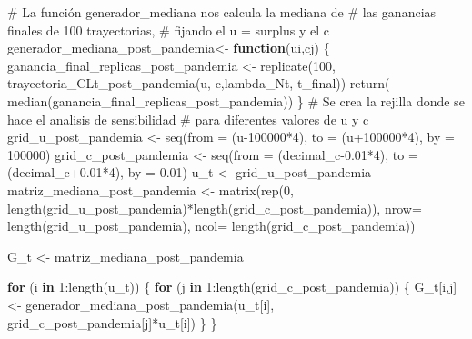 \documentclass[
  us-letterpaper,
]{scrreprt}
\newenvironment{Shaded}{\begin{snugshade}}{\end{snugshade}}
\newcommand{\AttributeTok}[1]{\textcolor[rgb]{0.40,0.45,0.13}{#1}}
\newcommand{\CommentTok}[1]{\textcolor[rgb]{0.37,0.37,0.37}{#1}}
\newcommand{\ControlFlowTok}[1]{\textcolor[rgb]{0.00,0.23,0.31}{\textbf{#1}}}
\newcommand{\DecValTok}[1]{\textcolor[rgb]{0.68,0.00,0.00}{#1}}
\newcommand{\FloatTok}[1]{\textcolor[rgb]{0.68,0.00,0.00}{#1}}
\newcommand{\FunctionTok}[1]{\textcolor[rgb]{0.28,0.35,0.67}{#1}}
\newcommand{\NormalTok}[1]{\textcolor[rgb]{0.00,0.23,0.31}{#1}}
\newcommand{\OtherTok}[1]{\textcolor[rgb]{0.00,0.23,0.31}{#1}}
\newcommand{\SpecialCharTok}[1]{\textcolor[rgb]{0.37,0.37,0.37}{#1}}
\theoremstyle{plain}
\theoremstyle{plain}
\theoremstyle{definition}
\theoremstyle{remark}
\begin{document}
\begin{Shaded}
\begin{Highlighting}[]
\CommentTok{\# La función generador\_mediana nos calcula la mediana de }
\CommentTok{\# las ganancias finales de 100 trayectorias, }
\CommentTok{\# fijando el u = surplus y el c}
\NormalTok{generador\_mediana\_post\_pandemia}\OtherTok{\textless{}{-}} \ControlFlowTok{function}\NormalTok{(ui,cj)}
\NormalTok{  \{}
\NormalTok{  ganancia\_final\_replicas\_post\_pandemia }\OtherTok{\textless{}{-}} \FunctionTok{replicate}\NormalTok{(}\DecValTok{100}\NormalTok{,}
           \FunctionTok{trayectoria\_CLt\_post\_pandemia}\NormalTok{(u, c,lambda\_Nt, t\_final))}
    \FunctionTok{return}\NormalTok{( }\FunctionTok{median}\NormalTok{(ganancia\_final\_replicas\_post\_pandemia))}
\NormalTok{  \}}
\CommentTok{\# Se crea la rejilla donde se hace el analisis de sensibilidad}
\CommentTok{\# para diferentes valores de u y c}
\NormalTok{grid\_u\_post\_pandemia }\OtherTok{\textless{}{-}} \FunctionTok{seq}\NormalTok{(}\AttributeTok{from =}\NormalTok{ (u}\DecValTok{{-}100000}\SpecialCharTok{*}\DecValTok{4}\NormalTok{), }
                            \AttributeTok{to =}\NormalTok{ (u}\SpecialCharTok{+}\DecValTok{100000}\SpecialCharTok{*}\DecValTok{4}\NormalTok{), }
                            \AttributeTok{by =} \DecValTok{100000}\NormalTok{)}
\NormalTok{grid\_c\_post\_pandemia }\OtherTok{\textless{}{-}} \FunctionTok{seq}\NormalTok{(}\AttributeTok{from =}\NormalTok{ (decimal\_c}\FloatTok{{-}0.01}\SpecialCharTok{*}\DecValTok{4}\NormalTok{), }
                            \AttributeTok{to =}\NormalTok{ (decimal\_c}\FloatTok{+0.01}\SpecialCharTok{*}\DecValTok{4}\NormalTok{), }
                            \AttributeTok{by =} \FloatTok{0.01}\NormalTok{)}
\NormalTok{u\_t }\OtherTok{\textless{}{-}}\NormalTok{ grid\_u\_post\_pandemia}
\NormalTok{matriz\_mediana\_post\_pandemia }\OtherTok{\textless{}{-}} \FunctionTok{matrix}\NormalTok{(}\FunctionTok{rep}\NormalTok{(}\DecValTok{0}\NormalTok{, }
      \FunctionTok{length}\NormalTok{(grid\_u\_post\_pandemia)}\SpecialCharTok{*}\FunctionTok{length}\NormalTok{(grid\_c\_post\_pandemia)),}
      \AttributeTok{nrow=} \FunctionTok{length}\NormalTok{(grid\_u\_post\_pandemia), }
      \AttributeTok{ncol=} \FunctionTok{length}\NormalTok{(grid\_c\_post\_pandemia))}

\NormalTok{G\_t }\OtherTok{\textless{}{-}}\NormalTok{ matriz\_mediana\_post\_pandemia}

\ControlFlowTok{for}\NormalTok{ (i }\ControlFlowTok{in} \DecValTok{1}\SpecialCharTok{:}\FunctionTok{length}\NormalTok{(u\_t)) }
\NormalTok{\{}
  \ControlFlowTok{for}\NormalTok{ (j }\ControlFlowTok{in} \DecValTok{1}\SpecialCharTok{:}\FunctionTok{length}\NormalTok{(grid\_c\_post\_pandemia)) }
\NormalTok{  \{}
\NormalTok{    G\_t[i,j] }\OtherTok{\textless{}{-}} \FunctionTok{generador\_mediana\_post\_pandemia}\NormalTok{(u\_t[i], }
\NormalTok{                                  grid\_c\_post\_pandemia[j]}\SpecialCharTok{*}\NormalTok{u\_t[i])}
\NormalTok{  \}}
\NormalTok{\} }


\end{Highlighting}
\end{Shaded}
\end{document}
